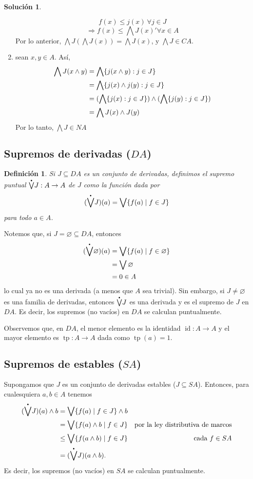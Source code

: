 \documentclass[12pt,letterpaper,titlepage]{article}
\let\emptyset\varnothing
\newtheorem*{defn}{Definición}
\theoremstyle{definition}
\newtheorem*{sol}{Solución}
\newcommand\Sup{\bigvee}
\renewcommand\inf{\wedge}
\newcommand\Inf{\bigwedge}
\newcommand\pSup{%
    {\stackrel{\raisebox{-3pt}{\scalebox{0.5}{$\bullet$}}}{\bigvee}}
  }%
\newcommand\tps[1]{\texorpdfstring{#1}{}}
\newcommand\<{\langle}
\renewcommand\>{\rangle}
\DeclareMathOperator{\id}{id}
\DeclareMathOperator{\tp}{tp}
\begin{document}
\begin{sol}
\begin{enumerate}
        $$f(x)\leq j(x) \ \forall j\in J$$
        $$\Rightarrow f(x)\leq \Inf J(x) ' \forall x\in A$$
        Por lo anterior, $\Inf J(\Inf J(x))=\Inf J(x)$, y $\Inf J \in CA$.
        \item sean $x,y\in A$. Así, 
        \begin{align*}
            \Inf J(x\inf y)&=\Inf\{j(x\inf y):j\in J\}\\
            &=\Inf\{j(x)\inf j(y):j\in J\}\\
            &=\large(\Inf\{j(x):j\in J\}\large)\inf\large( \Inf\{j(y):j\in J\}\large)\\
            &=\Inf J(x)\inf J(y)
        \end{align*}
        Por lo tanto, $\Inf J \in NA$
    \end{enumerate}
\end{sol}
\subsection{Supremos de derivadas \tps{($DA$)}}

\begin{defn}
  Si $J\subseteq DA$ es un conjunto de derivadas,
  definimos el supremo puntual $\pSup J:A\to A$ de $J$ como la
  función dada por
  \[
    (\pSup J)(a) = \Sup\{f(a) \mid f\in J\}
  \]
  para todo $a\in A$.
\end{defn}
Notemos que, si $J=\emptyset\subseteq DA$, entonces
\begin{align*}
  (\pSup\emptyset)(a)
  &= \Sup\{f(a) \mid f\in\emptyset\} \\
  &= \Sup\emptyset \\
  &= 0 \in A
\end{align*}
lo cual ya no es una derivada (a menos que $A$ sea trivial).
Sin embargo, si $J\neq\emptyset$ es una familia de derivadas,
entonces $\pSup J$ es una derivada y es el supremo de $J$ en
$DA$.
Es decir, los supremos (no vacíos) en $DA$ se calculan
puntualmente.

Observemos que, en $DA$, el menor elemento es la identidad
$\id:A\to A$ y el mayor elemento es $\tp:A\to A$ dada como
$\tp(a)=1$.

\subsection{Supremos de estables \tps{($SA$)}}

Supongamos que $J$ es un conjunto de derivadas estables
($J\subseteq SA$).
Entonces, para cualesquiera $a,b\in A$ tenemos
\begin{align*}
  (\pSup J)(a)\inf b
  &= \Sup\{f(a) \mid f\in J\} \inf b \\
  &= \Sup\{f(a)\inf b \mid f\in J\}
    & \text{por la ley distributiva de marcos} \\
  &\leq \Sup\{f(a\inf b) \mid f\in J \}
    & \text{cada $f\in SA$} \\
  &= (\pSup J)(a\inf b).
\end{align*}
Es decir, los supremos (no vacíos) en $SA$ se calculan
puntualmente.
\end{document}
